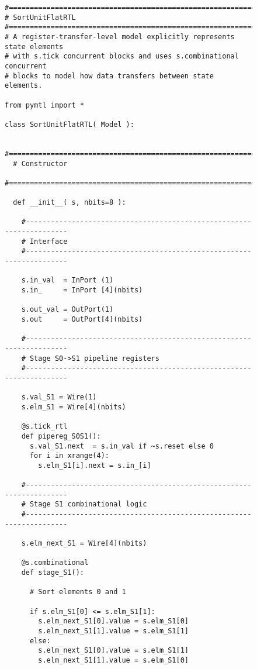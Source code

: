 
\begin{figure}

  \begin{lstlisting}[xleftmargin={0.9in}]
#=========================================================================
# SortUnitFlatRTL
#=========================================================================
# A register-transfer-level model explicitly represents state elements
# with s.tick concurrent blocks and uses s.combinational concurrent
# blocks to model how data transfers between state elements.

from pymtl import *

class SortUnitFlatRTL( Model ):

  #=======================================================================
  # Constructor
  #=======================================================================

  def __init__( s, nbits=8 ):

    #---------------------------------------------------------------------
    # Interface
    #---------------------------------------------------------------------

    s.in_val  = InPort (1)
    s.in_     = InPort [4](nbits)

    s.out_val = OutPort(1)
    s.out     = OutPort[4](nbits)

    #---------------------------------------------------------------------
    # Stage S0->S1 pipeline registers
    #---------------------------------------------------------------------

    s.val_S1 = Wire(1)
    s.elm_S1 = Wire[4](nbits)

    @s.tick_rtl
    def pipereg_S0S1():
      s.val_S1.next  = s.in_val if ~s.reset else 0
      for i in xrange(4):
        s.elm_S1[i].next = s.in_[i]

    #---------------------------------------------------------------------
    # Stage S1 combinational logic
    #---------------------------------------------------------------------

    s.elm_next_S1 = Wire[4](nbits)

    @s.combinational
    def stage_S1():

      # Sort elements 0 and 1

      if s.elm_S1[0] <= s.elm_S1[1]:
        s.elm_next_S1[0].value = s.elm_S1[0]
        s.elm_next_S1[1].value = s.elm_S1[1]
      else:
        s.elm_next_S1[0].value = s.elm_S1[1]
        s.elm_next_S1[1].value = s.elm_S1[0]


\end{lstlisting}
\end{figure}
